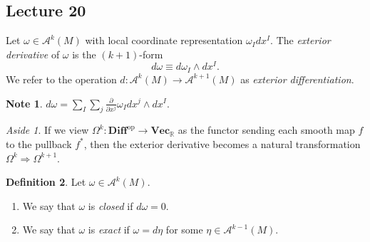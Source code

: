 \documentclass[10pt,letterpaper,cm]{nupset}
\theoremstyle{definition}
\newtheorem{definition}{Definition}[subsection]
\newtheorem{note}[definition]{Note}
\theoremstyle{theorem}
\theoremstyle{remark}
\newtheorem*{aside}{Aside}
\newcommand{\R}{\mathbb R}
\newcommand{\1}{\mathbf{1}}
\newcommand{\0}{\vec 0}
\DeclareMathOperator{\op}{op}
\begin{document}
\subsection{Lecture 20}


Let $\omega \in \mathcal{A}^k(M)$ with local coordinate representation $\omega_I dx^I$. The \textit{exterior derivative} of $\omega$ is the $\left(k+1\right)$-form $$d\omega \equiv d \omega_I \wedge dx^I.$$ We refer to the operation $d : \mathcal{A}^k(M) \to \mathcal{A}^{k+1}(M)$ as \textit{exterior differentiation}.


\begin{note}
$d \omega = \sum_I\sum_j\frac{\partial}{\partial{x^j}}\omega_I dx^j \wedge dx^I.$
\end{note}

\begin{aside}
If we view $\Omega^k : \mathbf{Diff}^{\op} \to \mathbf{Vec}_{\R}$ as the functor sending each smooth map $f$ to the pullback $f^{\ast}$, then the exterior derivative becomes a natural transformation $\Omega^k \Rightarrow \Omega^{k+1}$.  
\end{aside}

\begin{definition} Let $\omega \in \mathcal{A}^k(M)$.
\begin{enumerate}
\item We say that $\omega$ is \textit{closed} if $d \omega = 0$.
\item We say that $\omega$ is \textit{exact} if $\omega = d \eta$ for some $\eta \in \mathcal{A}^{k-1}(M)$.
\end{enumerate}
\end{definition}
\end{document}
